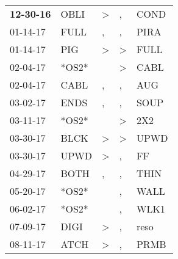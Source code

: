 \begin{supertabular}{p{0.07\textwidth}p{0.06\textwidth}p{0.02\textwidth}p{0.02\textwidth}p{0.06\textwidth}}
 \textbf{12-30-16\textsuperscript{}} &           OBLI\textsuperscript{} &     \textgreater &                , &           COND\textsuperscript{} \\
          01-14-17\textsuperscript{} &           FULL\textsuperscript{} &                , &                , &           PIRA\textsuperscript{} \\
          01-14-17\textsuperscript{} &            PIG\textsuperscript{} &     \textgreater &     \textgreater &           FULL\textsuperscript{} \\
          02-04-17\textsuperscript{} &                            *OS2* &                  &     \textgreater &           CABL\textsuperscript{} \\
          02-04-17\textsuperscript{} &           CABL\textsuperscript{} &                , &                , &            AUG\textsuperscript{} \\
          03-02-17\textsuperscript{} &           ENDS\textsuperscript{} &                , &                , &           SOUP\textsuperscript{} \\
          03-11-17\textsuperscript{} &                            *OS2* &                  &     \textgreater &            2X2\textsuperscript{} \\
          03-30-17\textsuperscript{} &           BLCK\textsuperscript{} &     \textgreater &     \textgreater &           UPWD\textsuperscript{} \\
          03-30-17\textsuperscript{} &           UPWD\textsuperscript{} &     \textgreater &                , &             FF\textsuperscript{} \\
          04-29-17\textsuperscript{} &           BOTH\textsuperscript{} &                , &                , &           THIN\textsuperscript{} \\
          05-20-17\textsuperscript{} &                            *OS2* &                  &                , &           WALL\textsuperscript{} \\
          06-02-17\textsuperscript{} &                            *OS2* &                  &                , &           WLK1\textsuperscript{} \\
          07-09-17\textsuperscript{} &           DIGI\textsuperscript{} &     \textgreater &                , &           reso\textsuperscript{} \\
          08-11-17\textsuperscript{} &           ATCH\textsuperscript{} &     \textgreater &                , &           PRMB\textsuperscript{} \\

\end{supertabular}
